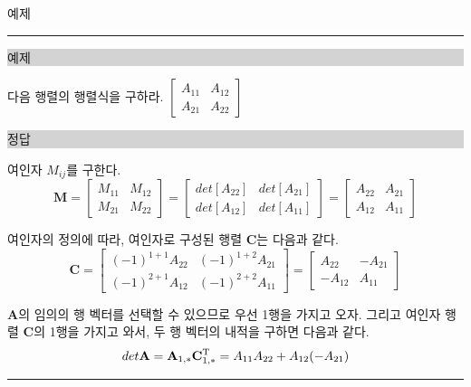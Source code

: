 \documentclass{beamer}
\begin{document}
\begin{frame}{예제}
\hrule

\noindent \colorbox{lightgray}{\begin{minipage}{6cm}예제\end{minipage}} 


\noindent  다음 행렬의 행렬식을 구하라.
$
\left [
\begin{array}{cc}
A_{11} & A_{12} \\
A_{21} & A_{22}
\end{array}
\right ]
$

\noindent \colorbox{lightgray}{\begin{minipage}{6cm}정답\end{minipage}} 

여인자 $M_{ij}$를 구한다.
$$
\mathbf M = 
\left [
\begin{array}{cc}
M_{11} & M_{12} \\
M_{21} & M_{22}
\end{array}
\right ] = 
\left [
\begin{array}{cc}
det \left [ A_{22} \right ] &
det \left [ A_{21} \right ] \\
det \left [ A_{12} \right ] &
det \left [ A_{11} \right ] 
\end{array}
\right ]
= 
\left [
\begin{array}{cc}
A_{22} & A_{21} \\
A_{12} & A_{11} 
\end{array}
\right ]
$$

여인자의 정의에 따라, 여인자로 구성된 행렬 $\mathbf C$는 다음과 같다.
$$
\mathbf C = 
\left [
\begin{array}{cc}
(-1)^{1+1} A_{22} & (-1)^{1+2} A_{21} \\
(-1)^{2+1} A_{12} & (-1)^{2+2} A_{11} 
\end{array}
\right ]
= \left [
\begin{array}{cc}
A_{22} & -A_{21} \\
-A_{12} & A_{11} 
\end{array}
\right ]
$$

$\mathbf A$의 임의의 행 벡터를 선택할 수 있으므로 우선 1행을 가지고 오자. 그리고 여인자 행렬 $\mathbf C$의 1행을 가지고 와서, 두 행 벡터의 내적을 
구하면 다음과 같다.
$$det \mathbf A  = \mathbf A_{1,*}  \mathbf C_{1,*}^{\rm T}  =  A_{11}  A_{22} +  A_{12} (-  A_{21}) $$

\hrule
\end{frame}
\end{document}
